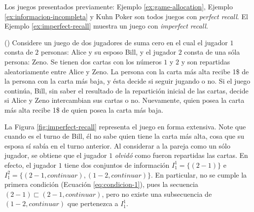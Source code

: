 Los juegos presentados previamente: Ejemplo \ref{ex:game-allocation}, Ejemplo \ref{ex:informacion-incompleta} y Kuhn Poker son todos juegos con \textit{perfect recall}. El Ejemplo \ref{ex:imperfect-recall} muestra un juego con \textit{imperfect recall}.

\begin{example} (\cite{bib:conceptos-basicos})
\label{ex:imperfect-recall}
Considere un juego de dos jugadores de suma cero en el cual el jugador $1$ consta de $2$ personas: Alice y su esposo Bill, y el jugador $2$ consta de una sóla persona: Zeno. Se tienen dos cartas con los números $1$ y $2$ y son repartidas aleatoriamente entre Alice y Zeno. La persona con la carta más alta recibe 1\$ de la persona con la carta más baja, y ésta decide si seguir jugando o no. Si el juego continúa, Bill, sin saber el resultado de la repartición inicial de las cartas, decide si Alice y Zeno intercambian sus cartas o no. Nuevamente, quien posea la carta más alta recibe 1\$ de quien posea la carta más baja.
\end{example}

 La Figura \ref{fig:imperfect-recall} representa el juego en forma extensiva. Note que cuando es el turno de Bill, él no sabe quien tiene la carta más alta, cosa que su esposa sí sabía en el turno anterior.  Al considerar a la pareja como un sólo jugador, se obtiene que el jugador $1$ \textit{olvidó} como fueron repartidas las cartas. En efecto, el jugador $1$ tiene dos conjuntos de información $I^1_1 = \{(2-1) \}$ e $I^2_1 = \{(2-1, continuar), (1-2, continuar) \}$. En particular, no se cumple la primera condición (Ecuación \ref{eq:condicion-1}), pues la secuencia $(2-1) \sqsubset (2-1, continuar)$, pero no existe una subsecuencia de $(1-2, continuar)$ que pertenezca a $I^1_1$.

